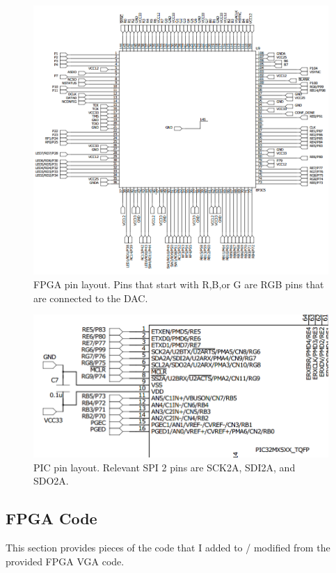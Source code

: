 \documentclass[11pt]{article}
\begin{document}
\begin{figure}[h!]
\centering
\includegraphics[scale=0.6]{fpga_sch.png}
\caption{FPGA pin layout. Pins that start with R,B,or G are RGB pins that are connected to the DAC.}
\label{fig:fpga_sch}
\end{figure} 


\begin{figure}[h!]
\centering
\includegraphics[scale=0.6]{pic_sch.png}
\caption{PIC pin layout. Relevant SPI 2 pins are SCK2A, SDI2A, and SDO2A.}
\label{fig:pic_sch}
\end{figure} 

\clearpage

\subsection{FPGA Code}
This section provides pieces of the code that I added to / modified from the provided FPGA VGA code.
\end{document}
